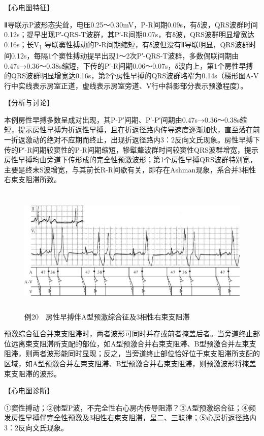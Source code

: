 【心电图特征】

Ⅱ导联示P波形态尖耸，电压0.25～0.30mV，P-R间期0.09s，有δ波，QRS波群时间0.12s；提早出现P′-QRS-T波群，其P′-R间期0.07s，有δ波，QRS波群明显增宽达0.16s；长V\textsubscript{1}
导联窦性搏动的P-R间期缩短，有δ波但没有Ⅱ导联明显，QRS波群时间0.12s，每隔1个窦性搏动提早出现1～2次P′-QRS-T波群，多数偶联间期由0.47s→0.36～0.38s缩短，下传的P′-R间期0.06～0.07s，δ波向上，第1个房性早搏的QRS波群明显增宽达0.16s，第2个房性早搏的QRS波群略窄为0.14s（梯形图A-V行中实线表示房室正道，虚线表示房室旁道、V行中斜影部分表示预激程度）。

【分析与讨论】

本例房性早搏多数呈成对出现，其P-P′间期、P′-P′间期由0.47s→0.36～0.38s缩短，提示房性早搏为折返性早搏，且在折返径路内传导速度逐渐加快，直至落在前一折返激动的绝对不应期而终止，出现折返径路内3：2反向文氏现象。房性早搏下传的P′-R间期较窦性的P-R间期缩短，犙犚犛波群时间较窦性QRS波群增宽，提示房性早搏均由旁道下传形成的完全性预激波形；第1个房性早搏QRS波群特别宽，主要是终末S波增宽，与其前长R-R间歇有关，即存在Ashman现象，系合并3相性右束支阻滞所致。

\begin{figure}[!htbp]
 \centering
 \includegraphics[width=5.76042in,height=2.40625in]{./images/Image00778.jpg}
 \captionsetup{justification=centering}
 \caption{例20　房性早搏伴A型预激综合征及3相性右束支阻滞}
 \label{fig50-20}
  \end{figure} 

预激综合征合并束支阻滞时，两者波形可同时并存或前者掩盖后者。当旁道终止部位远离束支阻滞所支配的部位，如A型预激合并右束支阻滞、B型预激合并左束支阻滞，则两者波形能同时显现；反之，当旁道终止部位恰好位于束支阻滞所支配的区域，如A型预激合并左束支阻滞、B型预激合并右束支阻滞，则预激波形将掩盖束支阻滞的波形。

【心电图诊断】

①窦性搏动；②肺型P波，不完全性右心房内传导阻滞？③A型预激综合征；④频发房性早搏伴完全性预激及3相性右束支阻滞，呈二、三联律；⑤心房折返径路内3：2反向文氏现象。

\protect\hypertarget{text00060.html}{}{}

\protect\hypertarget{text00060.htmlux5cux23chapter60}{}{}

